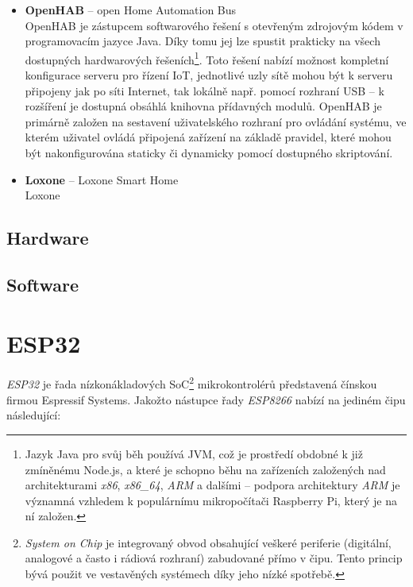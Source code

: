 \begin{itemize}
    \item \textbf{OpenHAB} -- open Home Automation Bus \\
    OpenHAB je zástupcem softwarového řešení s otevřeným zdrojovým kódem v programovacím jazyce Java.
    Díky tomu jej lze spustit prakticky na všech dostupných hardwarových řešeních\footnote{Jazyk Java pro svůj běh
    používá JVM, což je prostředí obdobné k již zmíněnému Node.js, a které je schopno běhu na zařízeních založených nad
    architekturami \textit{x86}, \textit{x86\_64}, \textit{ARM} a dalšími -- podpora architektury \textit{ARM} je
    významná vzhledem k populárnímu mikropočítači Raspberry Pi, který je na ní založen.}.
    Toto řešení nabízí možnost kompletní konfigurace serveru pro řízení IoT, jednotlivé uzly sítě mohou být k serveru
    připojeny jak po síti Internet, tak lokálně např. pomocí rozhraní USB -- k rozšíření je dostupná obsáhlá
    knihovna přídavných modulů.
    OpenHAB je primárně založen na sestavení uživatelského rozhraní pro ovládání systému, ve kterém uživatel ovládá
    připojená zařízení na základě pravidel, které mohou být nakonfigurována staticky či dynamicky pomocí dostupného
    skriptování.

    \item \textbf{Loxone} -- Loxone Smart Home \\
    Loxone
\end{itemize}

\subsection{Hardware}

\subsection{Software}

\section{ESP32}\label{sec:esp32}
\textit{ESP32} je řada nízkonákladových SoC\footnote{\textit{System on Chip} je integrovaný obvod obsahující veškeré
periferie (digitální, analogové a často i rádiová rozhraní) zabudované přímo v čipu.
Tento princip bývá použit ve vestavěných systémech díky jeho nízké spotřebě.} mikrokontrolérů představená čínskou
firmou Espressif Systems.
Jakožto nástupce řady \textit{ESP8266} nabízí na jediném čipu následující:

